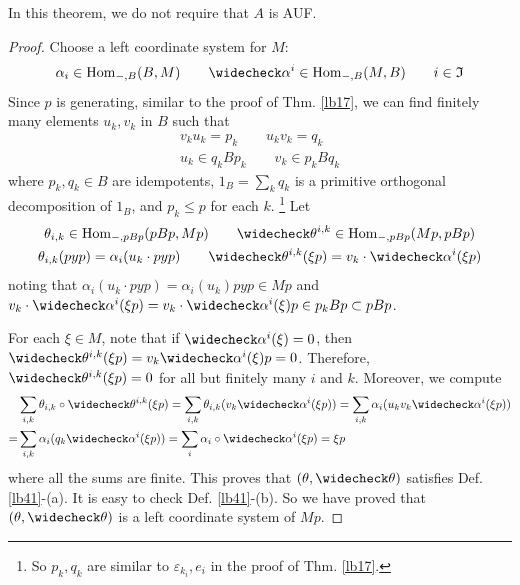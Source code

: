 \documentclass[11pt,b5paper,notitlepage]{article}
\theoremstyle{definition}
\theoremstyle{plain}
\newcommand{\fk}{\mathfrak}
\newcommand{\wch}{\widecheck}
\newcommand{\Hom}{\mathrm{Hom}}
\newcommand{\eps}{\varepsilon}
\numberwithin{equation}{section}
\begin{document}
In this theorem, we do not require that $A$ is AUF.



\begin{proof}
Choose a left coordinate system for $M$:
\begin{align*}
\alpha_i\in\Hom_{-,B}(B,M)\qquad \wch\alpha^i\in \Hom_{-,B}(M,B)\qquad i\in\fk I
\end{align*}
Since $p$ is generating, similar to the proof of Thm. \ref{lb17}, we can find finitely many elements $u_k,v_k$ in $B$ such that
\begin{gather*}
v_ku_k=p_k\qquad u_kv_k=q_k\\
u_k\in q_kBp_k\qquad v_k\in p_kBq_k
\end{gather*}
where $p_k,q_k\in B$ are idempotents, $1_B=\sum_k q_k$ is a primitive orthogonal decomposition of $1_B$, and $p_k\leq p$ for each $k$. \footnote{So $p_k,q_k$ are similar to $\eps_{k_i},e_i$ in the proof of Thm. \ref{lb17}.} Let
\begin{gather*}
\theta_{i,k}\in \Hom_{-,pBp}(pBp,Mp)\qquad \wch\theta^{i,k}\in\Hom_{-,pBp}(Mp,pBp)\\
\theta_{i,k}(pyp)=\alpha_i(u_k\cdot pyp)\qquad \wch\theta^{i,k}(\xi p)=v_k\cdot \wch\alpha^i(\xi p)
\end{gather*}
noting that $\alpha_i(u_k\cdot pyp)=\alpha_i(u_k)pyp\in Mp$ and $v_k\cdot \wch\alpha^i(\xi p)=v_k\cdot \wch\alpha^i(\xi)p\in p_kBp\subset pBp$. 

For each $\xi\in M$, note that if $\wch\alpha^i(\xi)=0$, then $\wch\theta^{i,k}(\xi p)=v_k\wch\alpha^i(\xi)p=0$. Therefore, $\wch\theta^{i,k}(\xi p)=0$ for all but finitely many $i$ and $k$. Moreover, we compute
\begin{align*}
&\sum_{i,k}\theta_{i,k}\circ\wch\theta^{i,k}(\xi p)=\sum_{i,k}\theta_{i,k}(v_k\wch\alpha^i(\xi p))=\sum_{i,k}\alpha_i(u_k v_k\wch\alpha^i(\xi p))\\
=&\sum_{i,k}\alpha_i(q_k\wch\alpha^i(\xi p))=\sum_{i}\alpha_i\circ\wch\alpha^i(\xi p)=\xi p
\end{align*}
where all the sums are finite. This proves that $(\theta,\wch\theta)$ satisfies Def. \ref{lb41}-(a). It is easy to check Def. \ref{lb41}-(b). So we have proved that $(\theta,\wch\theta)$ is a left coordinate system of $Mp$.



\end{proof}
\end{document}
